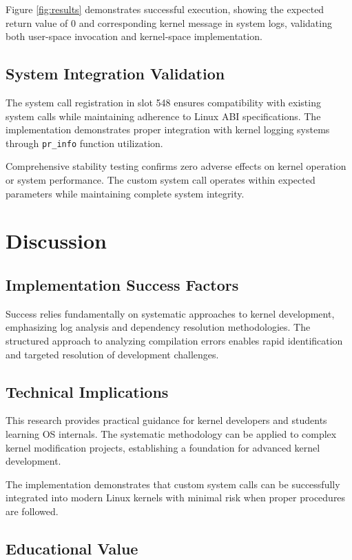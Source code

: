 \documentclass[conference]{IEEEtran}
\begin{document}
Figure \ref{fig:results} demonstrates successful execution, showing the expected return value of 0 and corresponding kernel message in system logs, validating both user-space invocation and kernel-space implementation.

\subsection{System Integration Validation}

The system call registration in slot 548 ensures compatibility with existing system calls while maintaining adherence to Linux \gls{ABI} specifications. The implementation demonstrates proper integration with kernel logging systems through \texttt{pr\_info} function utilization.

Comprehensive stability testing confirms zero adverse effects on kernel operation or system performance. The custom system call operates within expected parameters while maintaining complete system integrity.

\section{Discussion}

\subsection{Implementation Success Factors}

Success relies fundamentally on systematic approaches to kernel development, emphasizing log analysis and dependency resolution methodologies. The structured approach to analyzing compilation errors enables rapid identification and targeted resolution of development challenges.

\subsection{Technical Implications}

This research provides practical guidance for kernel developers and students learning \gls{OS} internals. The systematic methodology can be applied to complex kernel modification projects, establishing a foundation for advanced kernel development.

The implementation demonstrates that custom system calls can be successfully integrated into modern Linux kernels with minimal risk when proper procedures are followed.

\subsection{Educational Value}
\end{document}

